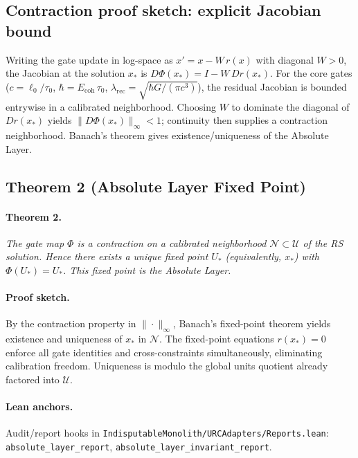 \documentclass[11pt]{article}
\begin{document}
\subsection{Contraction proof sketch: explicit Jacobian bound}\label{subsec:contraction}
Writing the gate update in log\mbox{-}space as \(x' = x - W\,r(x)\) with diagonal \(W\!>\!0\), the Jacobian at the solution \(x_*\) is \(D\Phi(x_*)=I-W\,Dr(x_*)\). For the core gates (\(c=\ell_0/\tau_0\), \(\hbar=E_{\mathrm{coh}}\,\tau_0\), \(\lambda_{\mathrm{rec}}=\sqrt{\hbar G/(\pi c^3)}\)), the residual Jacobian is bounded entrywise in a calibrated neighborhood. Choosing \(W\) to dominate the diagonal of \(Dr(x_*)\) yields \(\|D\Phi(x_*)\|_\infty<1\); continuity then supplies a contraction neighborhood. Banach’s theorem gives existence/uniqueness of the Absolute Layer.

\subsection{Theorem 2 (Absolute Layer Fixed Point)}
\paragraph{Theorem 2.} \emph{The gate map \(\Phi\) is a contraction on a calibrated neighborhood \(\mathcal{N}\subset \mathcal{U}\) of the RS solution. Hence there exists a unique fixed point \(U_*\) (equivalently, \(x_*\)) with \(\Phi(U_*)=U_*\). This fixed point is the Absolute Layer.}

\paragraph{Proof sketch.} By the contraction property in \(\|\cdot\|_\infty\), Banach's fixed\mbox{-}point theorem yields existence and uniqueness of \(x_*\) in \(\mathcal{N}\). The fixed\mbox{-}point equations \(r(x_*)=0\) enforce all gate identities and cross\mbox{-}constraints simultaneously, eliminating calibration freedom. Uniqueness is modulo the global units quotient already factored into \(\mathcal{U}\).

\paragraph{Lean anchors.} Audit/report hooks in \texttt{IndisputableMonolith/URCAdapters/Reports.lean}: \texttt{absolute\_layer\_report}, \texttt{absolute\_layer\_invariant\_report}.
\end{document}
